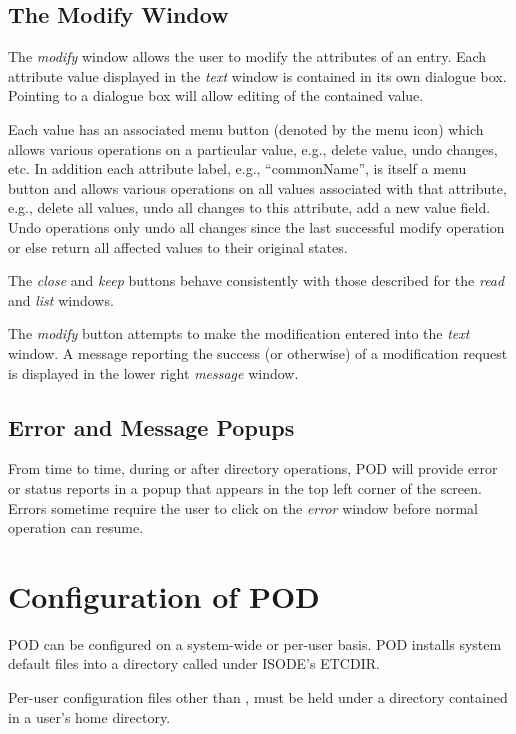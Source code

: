 \subsection {The Modify Window}

The {\em modify} window allows the user to modify the attributes of an entry.
Each attribute value displayed in the {\em text} window is contained in its
own dialogue box.
Pointing to a dialogue box will allow editing of the contained value.

Each value has an associated menu button (denoted by the menu
icon) which allows various operations on a particular value,
e.g., delete value,
undo changes, etc.
In addition each attribute label, e.g., 
``commonName'',
is itself a menu button and allows various operations on all values
associated with that attribute,
e.g., delete all values,
undo all changes to this attribute,
add a new value field.
Undo operations only undo all changes since the last successful modify
operation or else return all affected values to their original states.

The {\em close} and {\em keep} buttons behave consistently with those described for
the {\em read} and {\em list} windows.

The {\em modify} button attempts to make the modification entered into
the {\em text} window.
A message reporting the success (or otherwise) of a modification request
is displayed in the lower right {\em message} window.

\subsection {Error and Message Popups}

From time to time,
during or after directory operations,
POD will provide error or status reports in a popup that appears in
the top left corner of the screen.
Errors sometime require the user to click on the {\em error} window before
normal operation can resume.

\section {Configuration of POD}

POD can be configured on a system-wide or per-user basis.
POD installs system default files into a directory called 
under ISODE's ETCDIR.

Per-user configuration files other than ,
must be held under a directory  
contained in a user's home directory.

